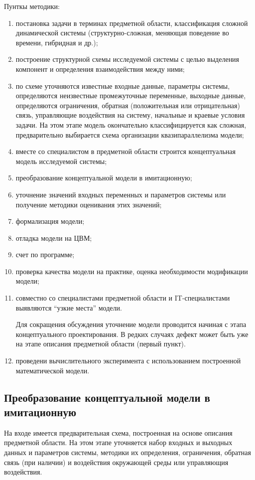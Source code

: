 \documentclass[12pt]{article}
\begin{document}
Пунткы методики:
\begin{enumerate}
    \item постановка задачи в терминах предметной области, классификация сложной динамической системы (структурно-сложная, меняющая поведение во времени, гибридная и др.);
    \item построение структурной схемы исследуемой системы с целью выделения компонент и определения взаимодействия между ними; 
    \item по схеме уточняются известные входные данные, параметры системы, определяются неизвестные промежуточные переменные, выходные данные, определяются ограничения, обратная (положительная или отрицательная) связь, управляющие воздействия на систему, начальные и краевые условия задачи. На этом этапе модель окончательно классифицируется как сложная, предварительно выбирается схема организации квазипараллелизма модели;
    \item вместе со специалистом в предметной области строится концептуальная модель исследуемой системы;
    \item преобразование концептуальной модели в имитационную;
    \item уточнение значений входных переменных и параметров системы или получение методики оценивания этих значений;
    \item формализация модели;
    \item отладка модели на ЦВМ;
    \item счет по программе;
    \item проверка качества модели на практике, оценка необходимости модификации модели;
    \item совместно со специалистами предметной области и IT-специалистами выявляются \enquote{узкие места} модели.
    
    Для сокращения обсуждения уточнение модели проводится начиная с этапа концептуального проектирования. В редких случаях дефект может быть уже на этапе описания предметной области (первый пункт). 

    \item проведени вычислительного эксперимента с использованием построенной математической модели.
\end{enumerate}

\subsection{Преобразование концептуальной модели в имитационную}
На входе имеется предварительная схема, построенная на основе описания предметной области. На этом этапе уточняется набор входных и выходных данных и параметров системы, методики их определения, ограничения, обратная связь (при наличии) и воздействия окружающей среды или управляющия воздействия.
\end{document}
